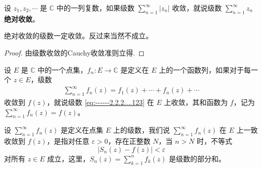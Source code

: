 \documentclass[../../main.tex]{subfiles}
\begin{document}
\begin{definition}
设 \( z_1, z_2, \cdots \) 是 \( \mathbb{C} \) 中的一列复数，如果级数 \( \sum_{n=1}^{\infty} |z_n| \) 收敛，就说级数 \( \sum_{n=1}^{\infty} z_n \) \textbf{绝对收敛}。
\end{definition}

\begin{proposition}
绝对收敛的级数一定收敛。反过来当然不成立。
\end{proposition}
\begin{proof}
由级数收敛的Cauchy收敛准则立得.
\end{proof}

\begin{definition}
设 \( E \) 是 \( \mathbb{C} \) 中的一个点集，\( f_n: E \to \mathbb{C} \) 是定义在 \( E \) 上的一个函数列，如果对于每一个 \( z \in E \)，级数
\begin{align}
\sum_{n=1}^{\infty} f_n(z) = f_1(z) + \cdots + f_n(z) + \cdots\label{eq:------2.2.2....123}
\end{align}
收敛到 \( f(z) \)，就说级数 \eqref{eq:------2.2.2....123} 在 \( E \) 上收敛，其和函数为 \( f \)，记为 \( \sum_{n=1}^{\infty} f_n(z) = f(z) \)。
\end{definition}

\begin{definition}
设 \( \sum_{n=1}^{\infty} f_n(z) \) 是定义在点集 \( E \) 上的级数，我们说 \( \sum_{n=1}^{\infty} f_n(z) \) 在 \( E \) 上一致收敛到 \( f(z) \)，是指对任意 \( \varepsilon > 0 \)，存在正整数 \( N \)，当 \( n > N \) 时，不等式
\[
|S_n(z) - f(z)| < \varepsilon
\]
对所有 \( z \in E \) 成立，这里，\( S_n(z) = \sum_{k=1}^{n} f_k(z) \) 是级数的部分和。
\end{definition}
\end{document}
